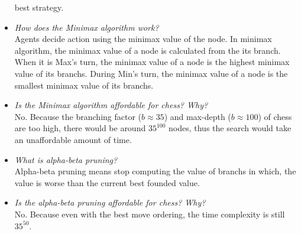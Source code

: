 \documentclass[a4paper, 12pt]{article}
\begin{document}
\begin{itemize}
			best strategy.
		\item \emph{How does the Minimax algorithm work?}\\		      
			Agents decide action using the minimax value of the node. In minimax algorithm, the minimax value of a node
			is calculated from the its branch. When it is Max's turn, the minimax value of a node is the highest minimax 
			value of its branchs. During Min's turn, the minimax value of a node is the smallest minimax value of its branchs.
		\item \emph{Is the Minimax algorithm affordable for chess? Why?}\\
			No. Because the branching factor ($b \approx 35$) and max-depth ($b \approx 100$) of chess are too high, 
			there would be around $35^{100}$ nodes, thus the search would take an unaffordable amount of time.
		\item \emph{What is alpha-beta pruning?}\\
			Alpha-beta pruning means stop computing the value of branchs in which, the value is worse
			than the current best founded value.
		\item \emph{Is the alpha-beta pruning affordable for chess? Why?}\\
			No. Because even with the best move ordering, the time complexity is still $35^{50}$.
    \end{itemize}
\end{document}
